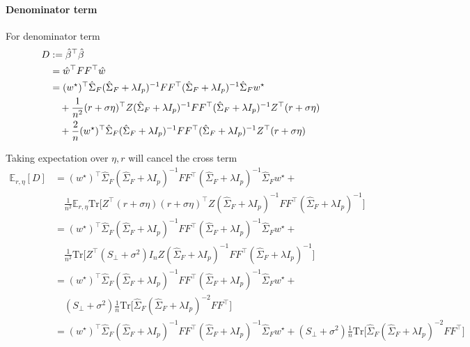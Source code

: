 \paragraph{Denominator term}

For denominator term
\begin{align*}
D & :={\hat{\beta}}^{\top}\hat{\beta}\\
 & =\hat{w}^{\top}FF^{\top}\hat{w}\\
 & =(w^{\star})^{\top}\hat{\Sigma}_{F}(\hat{\Sigma}_{F}+\lambda I_{p})^{-1}FF^{\top}(\hat{\Sigma}_{F}+\lambda I_{p})^{-1}\hat{\Sigma}_{F}w^{\star}\\
 & \quad+\frac{1}{n^{2}}(r+\sigma\eta)^{\top}Z(\hat{\Sigma}_{F}+\lambda I_{p})^{-1}FF^{\top}(\hat{\Sigma}_{F}+\lambda I_{p})^{-1}Z^{\top}(r+\sigma\eta)\\
 & \quad+\frac{2}{n}(w^{\star})^{\top}\hat{\Sigma}_{F}(\hat{\Sigma}_{F}+\lambda I_{p})^{-1}FF^{\top}(\hat{\Sigma}_{F}+\lambda I_{p})^{-1}Z^{\top}(r+\sigma\eta)
\end{align*}

Taking expectation over $\eta,r$ will cancel the cross term
\begin{align*}
\mathbb{E}_{r,\eta}[D] & =(w^{\star})^{\top}\hat{\Sigma}_{F}(\hat{\Sigma}_{F}+\lambda I_{p})^{-1}FF^{\top}(\hat{\Sigma}_{F}+\lambda I_{p})^{-1}\hat{\Sigma}_{F}w^{\star}+\\
 & \quad\frac{1}{n^{2}}\mathbb{E}_{r,\eta}\mathrm{Tr}\Big[Z^{\top}(r+\sigma\eta)(r+\sigma\eta)^{\top}Z(\hat{\Sigma}_{F}+\lambda I_{p})^{-1}FF^{\top}(\hat{\Sigma}_{F}+\lambda I_{p})^{-1}\Big]\\
 & =(w^{\star})^{\top}\hat{\Sigma}_{F}(\hat{\Sigma}_{F}+\lambda I_{p})^{-1}FF^{\top}(\hat{\Sigma}_{F}+\lambda I_{p})^{-1}\hat{\Sigma}_{F}w^{\star}+\\
 & \quad\frac{1}{n^{2}}\mathrm{Tr}\Big[Z^{\top}(S_{\perp}+\sigma^{2})I_{n}Z(\hat{\Sigma}_{F}+\lambda I_{p})^{-1}FF^{\top}(\hat{\Sigma}_{F}+\lambda I_{p})^{-1}\Big]\\
 & =(w^{\star})^{\top}\hat{\Sigma}_{F}(\hat{\Sigma}_{F}+\lambda I_{p})^{-1}FF^{\top}(\hat{\Sigma}_{F}+\lambda I_{p})^{-1}\hat{\Sigma}_{F}w^{\star}+\\
 & \quad(S_{\perp}+\sigma^{2})\frac{1}{n}\mathrm{Tr}\Big[\hat{\Sigma}_{F}(\hat{\Sigma}_{F}+\lambda I_{p})^{-2}FF^{\top}\Big]\\
 & =(w^{\star})^{\top}\hat{\Sigma}_{F}(\hat{\Sigma}_{F}+\lambda I_{p})^{-1}FF^{\top}(\hat{\Sigma}_{F}+\lambda I_{p})^{-1}\hat{\Sigma}_{F}w^{\star}+(S_{\perp}+\sigma^{2})\frac{1}{n}\mathrm{Tr}\Big[\hat{\Sigma}_{F}(\hat{\Sigma}_{F}+\lambda I_{p})^{-2}FF^{\top}\Big]
\end{align*}

